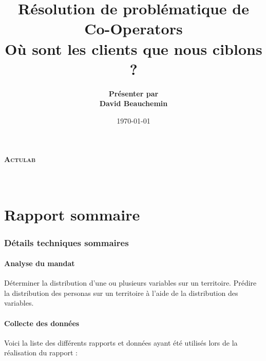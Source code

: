 \documentclass[11pt,french]{article}\usepackage[]{graphicx}\usepackage[]{color}
\title{Résolution de problématique de \\ Co-Operators \\ \bigskip Où sont les clients que nous ciblons ?}
\author{\textbf{Présenter par \\ David Beauchemin}}
\date{\today}
\begin{document}
\makeatletter
  \begin{titlepage}
  \centering
      {\fontsize{52}{52} \textbf{\textsc{Actulab}}}\\
    \vspace{2cm}
    \vspace{2cm}
    \vspace{2cm}
      {\fontsize{20}{20}\textbf{\@title}} \\
    \vfill
       {\Huge \@author} \\
    \vspace{8cm}
    \vfill
  \end{titlepage}
\makeatother


\pagebreak

\tableofcontents

\clearpage

\part{Rapport sommaire}

\section{Détails techniques sommaires}

\subsection*{Analyse du mandat}

Déterminer la distribution d'une ou plusieurs variables sur un territoire. Prédire la distribution des personas sur un territoire à l'aide de la distribution des variables.

\subsection*{Collecte des données}

Voici la liste des différents rapports et données ayant été utilisés lors de la réalisation du rapport :
\end{document}
